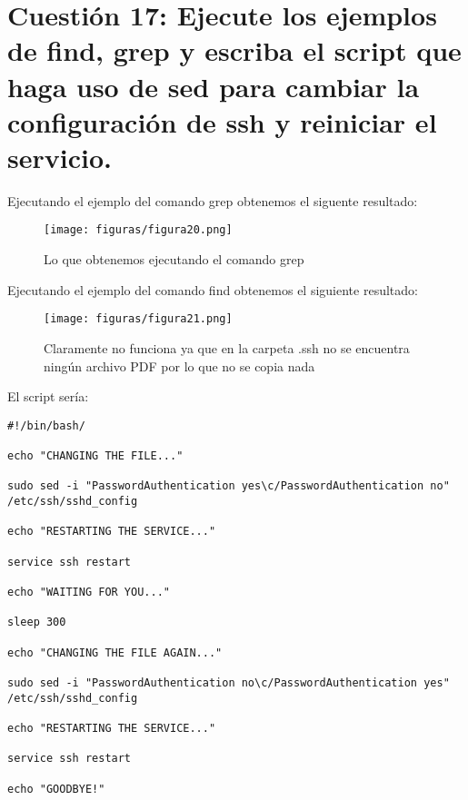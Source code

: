 \section{Cuestión 17: Ejecute los ejemplos de find, grep y escriba el script que haga uso de sed para cambiar la configuración de ssh y reiniciar el servicio.}
Ejecutando el ejemplo del comando grep obtenemos el siguente resultado: 
\begin{figure}[H] %
	\centering
	\texttt{[image: figuras/figura20.png]}  %
	\label{figura20}
	
	\caption{Lo que obtenemos ejecutando el comando grep } 
\end{figure}
Ejecutando el ejemplo del comando find obtenemos el siguiente resultado:
\begin{figure}[H] %
	\centering
	\texttt{[image: figuras/figura21.png]}  %
	\label{figura21}
	
	\caption{Claramente no funciona ya que en la carpeta .ssh no se encuentra ningún archivo PDF por lo que no se copia nada } 
\end{figure}

El script sería:\\
\begin{lstlisting}
#!/bin/bash/

echo "CHANGING THE FILE..." 

sudo sed -i "PasswordAuthentication yes\c/PasswordAuthentication no"  /etc/ssh/sshd_config

echo "RESTARTING THE SERVICE..."

service ssh restart 

echo "WAITING FOR YOU..."

sleep 300

echo "CHANGING THE FILE AGAIN..."

sudo sed -i "PasswordAuthentication no\c/PasswordAuthentication yes"  /etc/ssh/sshd_config

echo "RESTARTING THE SERVICE..."

service ssh restart 

echo "GOODBYE!"

\end{lstlisting}


